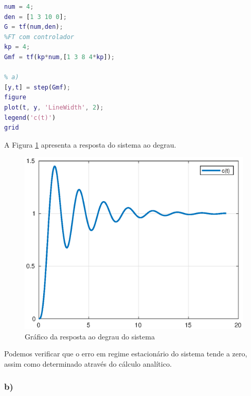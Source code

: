     \begin{lstlisting}[language=Matlab,label=Q1A,caption=Análise da estabilidade]
%FT sem controlador
num = 4;
den = [1 3 10 0];
G = tf(num,den);
%FT com controlador
kp = 4;
Gmf = tf(kp*num,[1 3 8 4*kp]);

% a)
[y,t] = step(Gmf);
figure
plot(t, y, 'LineWidth', 2);
legend('c(t)')
grid
    \end{lstlisting}

    A Figura \ref{fig:Q1A} apresenta a resposta do sistema ao degrau.


    \begin{figure}[!h]
        \centering
        \includegraphics[width = 0.75\linewidth]{Figuras/ProblemasPI/Problema1/step1.eps}
        \caption{Gráfico da resposta ao degrau do sistema}
        \label{fig:Q1A}                   
    \end{figure}

    Podemos verificar que o erro em regime estacionário do sistema tende a zero, assim como determinado 
    através do cálculo analítico.

\subsubsection*{b)}
